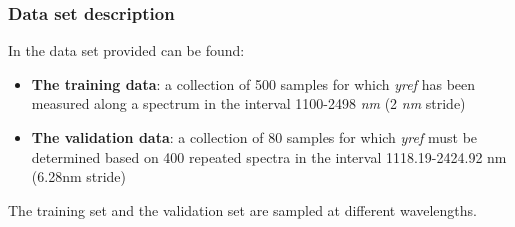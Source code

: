 \begin{frame}
    \frametitle{Data set description}
    In the data set provided can be found:
    \begin{itemize}
        \item \textbf{The training data}: a collection of 500 samples for which \textit{yref} has been measured along a spectrum in the interval 1100-2498 \textit{nm} (2 \textit{nm} stride)
        \item \textbf{The validation data}: a collection of 80 samples for which \textit{yref} must be determined based on 400 repeated spectra in the interval 1118.19-2424.92 nm (6.28nm stride)
    \end{itemize}
    The training set and the validation set are sampled at different wavelengths.
\end{frame}
